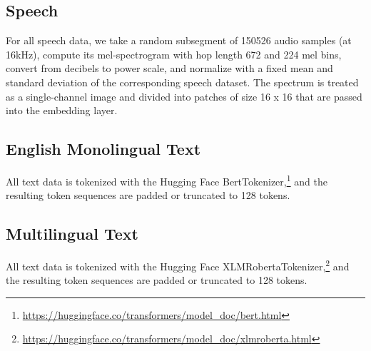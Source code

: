 \documentclass{article}
\begin{document}
\subsection{Speech}
For all speech data, we take a random subsegment of 150526 audio samples (at 16kHz), compute its mel-spectrogram with hop length 672 and 224 mel bins, convert from decibels to power scale, and normalize with a fixed mean and standard deviation of the corresponding speech dataset. The spectrum is treated as a single-channel image and divided into patches of size 16 x 16 that are passed into the embedding layer.

\subsection{English Monolingual Text}
All text data is tokenized with the Hugging Face BertTokenizer,\footnote{\url{https://huggingface.co/transformers/model_doc/bert.html}} and the resulting token sequences are padded or truncated to 128 tokens.

\subsection{Multilingual Text}
All text data is tokenized with the Hugging Face XLMRobertaTokenizer,\footnote{\url{https://huggingface.co/transformers/model_doc/xlmroberta.html}} and the resulting token sequences are padded or truncated to 128 tokens.
\end{document}
